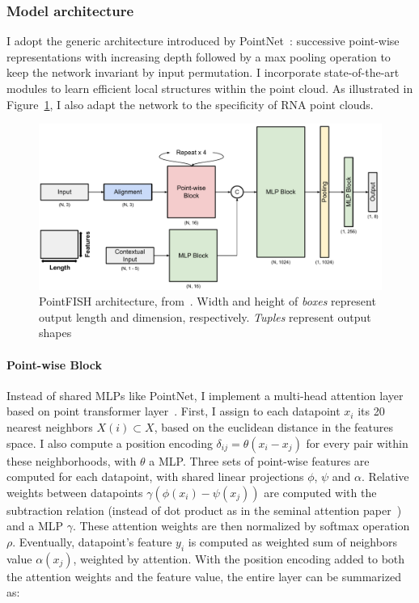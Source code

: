 \subsubsection{Model architecture}

I adopt the generic architecture introduced by PointNet~\cite{Qi_2017_CVPR}: successive point-wise representations with increasing depth followed by a max pooling operation to keep the network invariant by input permutation.
I incorporate state-of-the-art modules to learn efficient local structures within the point cloud.
As illustrated in Figure~\ref{fig:PointFISH_architecture}, I also adapt the network to the specificity of RNA point clouds.

\begin{figure}[]
    \centering
    \includegraphics[width=1\textwidth]{figures/chapter4/PointFISH_architecture}
    \caption[PointFISH model]{PointFISH architecture, from~\cite{pointfish_2022}.
	Width and height of \textit{boxes} represent output length and dimension, respectively.
	\textit{Tuples} represent output shapes}
    \label{fig:PointFISH_architecture}
\end{figure}

\paragraph{Point-wise Block}

Instead of shared MLPs like PointNet, I implement a multi-head attention layer based on point transformer layer~\cite{Zhao_2021_ICCV}.
First, I assign to each datapoint $x_i$ its 20 nearest neighbors $X(i) \subset X$, based on the euclidean distance in the features space.
I also compute a position encoding $\delta_{ij} = \theta(x_i - x_j)$ for every pair within these neighborhoods, with $\theta$ a MLP.
Three sets of point-wise features are computed for each datapoint, with shared linear projections $\phi$, $\psi$ and $\alpha$.
Relative weights between datapoints $\gamma(\phi(x_i) - \psi(x_j))$ are computed with the subtraction relation (instead of dot product as in the seminal attention paper~\cite{NIPS2017_3f5ee243}) and a MLP $\gamma$.
These attention weights are then normalized by softmax operation $\rho$.
Eventually, datapoint's feature $y_i$ is computed as weighted sum of neighbors value $\alpha(x_j)$, weighted by attention.
With the position encoding added to both the attention weights and the feature value, the entire layer can be summarized as:

